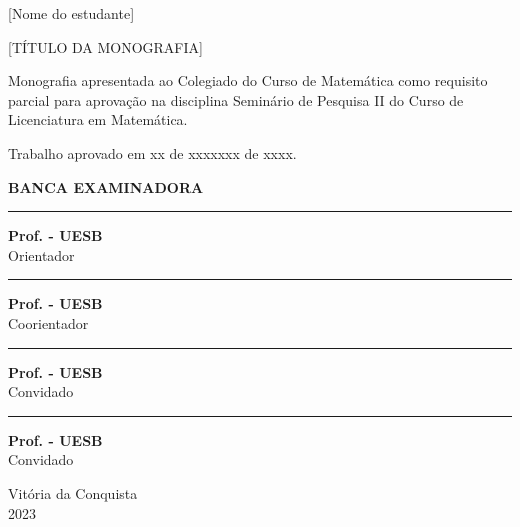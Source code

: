 \begin{titlepage}
    \begin{center}
		
		\vspace{0.5cm}		
		[Nome do estudante]
		\vspace{0.5cm}
	\end{center}

		
	\begin{center}		
		\vspace{1cm}
		{\large {[TÍTULO DA MONOGRAFIA]\\}}
		
		\vspace{3cm}
	\end{center}
	\vspace{-2cm}

Monografia apresentada ao Colegiado do Curso de Matemática como requisito parcial para aprovação na disciplina Seminário de Pesquisa II do Curso de Licenciatura em Matemática. 

\noindent Trabalho aprovado em xx de xxxxxxx de xxxx.

	\vspace{1.5cm}
	\begin{center}
	 	\textbf{BANCA EXAMINADORA}
	\end{center}
		
	\vspace{0.7cm}
	\begin{center}
		
		\rule{11cm}{0.1mm}
		
		\textbf{Prof. - UESB}\\
		Orientador
		
		\vspace{0.8cm}
		
		\rule{11cm}{0.1mm}
		
		\textbf{Prof. - UESB}\\
		Coorientador
		
		\vspace{0.8cm}
		\rule{11cm}{0.1mm}
		
		\textbf{Prof. - UESB}\\
		Convidado
  
  		\vspace{0.8cm}
		\rule{11cm}{0.1mm}
		
		\textbf{Prof. - UESB}\\
		Convidado		
	\end{center}
	 \vfill
	 \centering
		Vit\'oria da Conquista\\2023
\end{titlepage}